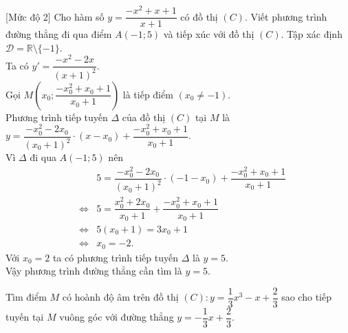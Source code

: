 
\begin{bt}%
[Mức độ 2]%
Cho hàm số $y=\dfrac{-x^2+x+1}{x+1}$ có đồ thị $(C)$. Viết phương trình đường thẳng đi qua điểm $A(-1;5)$ và tiếp xúc với đồ thị $(C)$.
\loigiai
{Tập xác định $\mathscr{D}=\mathbb{R}\setminus\{-1\}$.\\
Ta có $y'=\dfrac{-x^2-2x}{(x+1)^2}$.\\
Gọi $M\left(x_0;\dfrac{-x_0^2+x_0+1}{x_0+1}\right)$  là tiếp điểm $(x_0\neq -1)$.\\
Phương trình tiếp tuyến $\Delta$  của đồ thị $(C)$ tại $M$ là $y=\dfrac{-x_0^2-2x_0}{(x_0+1)^2}\cdot (x-x_0)+\dfrac{-x_0^2+x_0+1}{x_0+1}$.\\
Vì $\Delta$ đi qua $A(-1;5)$ nên \begin{eqnarray*}
&& 5=\dfrac{-x_0^2-2x_0}{(x_0+1)^2}\cdot (-1-x_0)+\dfrac{-x_0^2+x_0+1}{x_0+1}\\
&\Leftrightarrow & 5=\dfrac{x_0^2+2x_0}{x_0+1}+\dfrac{-x_0^2+x_0+1}{x_0+1}\\
&\Leftrightarrow & 5(x_0+1)=3x_0+1\\
&\Leftrightarrow & x_0=-2.
\end{eqnarray*}
Với $x_0=2$ ta có phương trình tiếp tuyến $\Delta$ là $y=5$.\\
Vậy phương trình đường thẳng cần tìm là $y=5$.
}
\end{bt}

\begin{bt}%
	Tìm điểm $M$ có hoành độ âm trên đồ thị $(C): y=\dfrac{1}{3}x^3-x+\dfrac{2}{3}$ sao cho tiếp tuyến tại $M$ vuông góc với đường thẳng $y=-\dfrac{1}{3}x+\dfrac{2}{3}$.
\end{bt}

